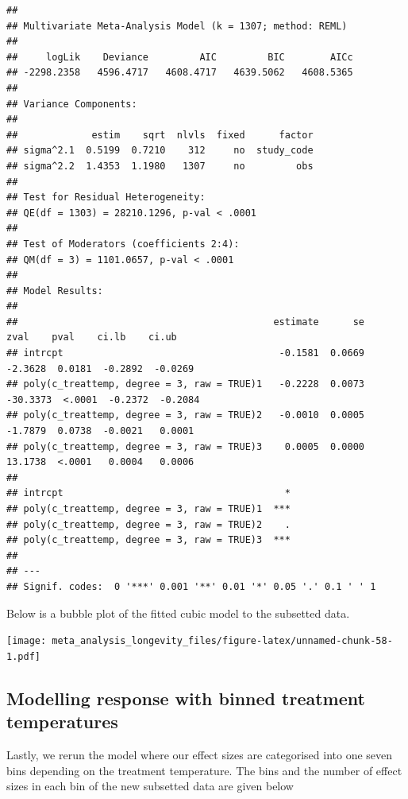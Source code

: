 \documentclass[
]{article}
\newenvironment{Shaded}{\begin{snugshade}}{\end{snugshade}}
\newcommand{\FunctionTok}[1]{\textcolor[rgb]{0.13,0.29,0.53}{\textbf{#1}}}
\newcommand{\NormalTok}[1]{#1}
\newcommand{\SpecialCharTok}[1]{\textcolor[rgb]{0.81,0.36,0.00}{\textbf{#1}}}
\begin{document}
\begin{verbatim}
## 
## Multivariate Meta-Analysis Model (k = 1307; method: REML)
## 
##     logLik    Deviance         AIC         BIC        AICc   
## -2298.2358   4596.4717   4608.4717   4639.5062   4608.5365   
## 
## Variance Components:
## 
##             estim    sqrt  nlvls  fixed      factor 
## sigma^2.1  0.5199  0.7210    312     no  study_code 
## sigma^2.2  1.4353  1.1980   1307     no         obs 
## 
## Test for Residual Heterogeneity:
## QE(df = 1303) = 28210.1296, p-val < .0001
## 
## Test of Moderators (coefficients 2:4):
## QM(df = 3) = 1101.0657, p-val < .0001
## 
## Model Results:
## 
##                                             estimate      se      zval    pval    ci.lb    ci.ub 
## intrcpt                                      -0.1581  0.0669   -2.3628  0.0181  -0.2892  -0.0269 
## poly(c_treattemp, degree = 3, raw = TRUE)1   -0.2228  0.0073  -30.3373  <.0001  -0.2372  -0.2084 
## poly(c_treattemp, degree = 3, raw = TRUE)2   -0.0010  0.0005   -1.7879  0.0738  -0.0021   0.0001 
## poly(c_treattemp, degree = 3, raw = TRUE)3    0.0005  0.0000   13.1738  <.0001   0.0004   0.0006 
##                                                 
## intrcpt                                       * 
## poly(c_treattemp, degree = 3, raw = TRUE)1  *** 
## poly(c_treattemp, degree = 3, raw = TRUE)2    . 
## poly(c_treattemp, degree = 3, raw = TRUE)3  *** 
## 
## ---
## Signif. codes:  0 '***' 0.001 '**' 0.01 '*' 0.05 '.' 0.1 ' ' 1
\end{verbatim}

\newpage

Below is a bubble plot of the fitted cubic model to the subsetted data.

\texttt{[image: meta\_analysis\_longevity\_files/figure-latex/unnamed-chunk-58-1.pdf]}

\hypertarget{modelling-response-with-binned-treatment-temperatures-1}{%
\subsection{Modelling response with binned treatment
temperatures}\label{modelling-response-with-binned-treatment-temperatures-1}}

Lastly, we rerun the model where our effect sizes are categorised into
one seven bins depending on the treatment temperature. The bins and the
number of effect sizes in each bin of the new subsetted data are given
below

\begin{Shaded}
\end{Shaded}
\end{document}
